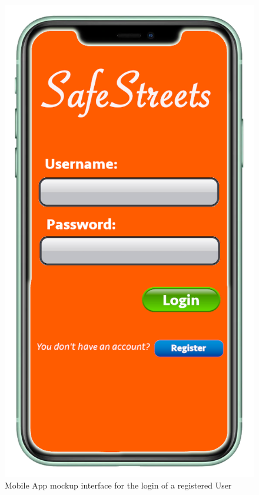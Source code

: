 \documentclass[a4paper]{report}
\begin{document}
\begin{figure}
\begin{minipage}{.45\textwidth}
\includegraphics[width=.7\linewidth]{mockups/loginscreen.png}
\caption[Mobile App mockup for the login screen]{Mobile App mockup interface for the login of a registered User}
\label{fig:login-page}
\end{minipage}
\end{figure}
\end{document}
